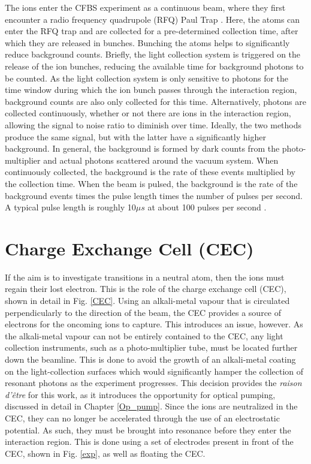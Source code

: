 The ions enter the CFBS experiment as a continuous beam, where they first encounter a radio frequency quadrupole (RFQ) Paul Trap \cite{CFBS}. Here, the atoms can enter the RFQ trap and are collected for a pre-determined collection time, after which they are released in bunches. Bunching the atoms helps to significantly reduce background counts. Briefly, the light collection system is triggered on the release of the ion bunches, reducing the available time for background photons to be counted. As the light collection system is only sensitive to photons for the time window during which the ion bunch passes through the interaction region, background counts are also only collected for this time. Alternatively, photons are collected continuously, whether or not there are ions in the interaction region, allowing the signal to noise ratio to diminish over time. Ideally, the two methods produce the same signal, but with the latter have a significantly higher background. In general, the background is formed by dark counts from the photo-multiplier and actual photons scattered around the vacuum system. When continuously collected, the background is the rate of these events multiplied by the collection time. When the beam is pulsed, the background is the rate of the background events times the pulse length times the number of pulses per second. A typical pulse length is roughly 10$\mu s$ at about 100 pulses per second \cite{CFBS}.

\section{Charge Exchange Cell (CEC)}
If the aim is to investigate transitions in a neutral atom, then the ions must regain their lost electron. This is the role of the charge exchange cell (CEC), shown in detail in Fig. \ref{CEC}. Using an alkali-metal vapour that is circulated perpendicularly to the direction of the beam, the CEC provides a source of electrons for the oncoming ions to capture. This introduces an issue, however. As the alkali-metal vapour can not be entirely contained to the CEC, any light collection instruments, such as a photo-multiplier tube,  must be located further down the beamline. This is done to avoid the growth of an alkali-metal coating on the light-collection surfaces which would significantly hamper the collection of resonant photons as the experiment progresses. This decision provides the \emph{raison d'être} for this work, as it introduces the opportunity for optical pumping, discussed in detail in Chapter \ref{Op_pump}. Since the ions are neutralized in the CEC, they can no longer be accelerated through the use of an electrostatic potential. As such, they must be brought into resonance before they enter the interaction region. This is done using a set of electrodes present in front of the CEC, shown in Fig. \ref{exp}, as well as floating the CEC.

